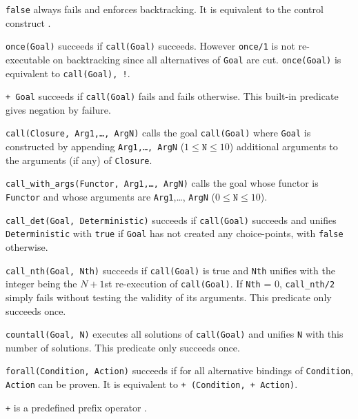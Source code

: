 \Description

\texttt{false} always fails and enforces backtracking. It is equivalent to the
 control construct .

\texttt{once(Goal)} succeeds if \texttt{call(Goal)} succeeds. However
\texttt{once/1} is not re-executable on backtracking since all alternatives
of \texttt{Goal} are cut. \texttt{once(Goal)} is equivalent to
\texttt{call(Goal), !}.

\texttt{{\bs}+ Goal} succeeds if \texttt{call(Goal)} fails and fails
otherwise. This built-in predicate gives negation by failure.

\texttt{call(Closure, Arg1,\ldots, ArgN)} calls the goal \texttt{call(Goal)}
where \texttt{Goal} is constructed by appending \texttt{Arg1,\ldots, ArgN}
($1 \leq \texttt{N} \leq 10$) additional arguments to the arguments (if any)
of \texttt{Closure}.

\texttt{call\_with\_args(Functor, Arg1,\ldots, ArgN)} calls the goal
whose functor is \texttt{Functor} and whose arguments are
\texttt{Arg1},\ldots, \texttt{ArgN} ($0 \leq \texttt{N} \leq 10$).

\texttt{call\_det(Goal, Deterministic)} succeeds if \texttt{call(Goal)}
succeeds and unifies \texttt{Deterministic} with \texttt{true} if
\texttt{Goal} has not created any choice-points, with \texttt{false}
otherwise.

\texttt{call\_nth(Goal, Nth)} succeeds if \texttt{call(Goal)} is true and
\texttt{Nth} unifies with the integer being the $N+1$st re-execution of
\texttt{call(Goal)}. If \texttt{Nth} = 0, \texttt{call\_nth/2} simply fails
without testing the validity of its arguments. This predicate only succeeds
once.

\texttt{countall(Goal, N)} executes all solutions of \texttt{call(Goal)} and
unifies \texttt{N} with this number of solutions. This predicate only
succeeds once.

\texttt{forall(Condition, Action)} succeeds if for all alternative bindings of
\texttt{Condition}, \texttt{Action} can be proven.
It is equivalent to \texttt{{\bs}+ (Condition, {\bs}+ Action)}.


\texttt{{\bs}+} is a predefined prefix operator .

